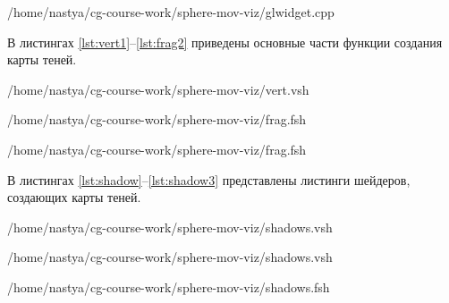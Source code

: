 \begin{lstinputlisting}[
	caption={Продолжение листинга \ref{lst:shadgen}},
	label={lst:shadgen2},
	style={cpp},
	linerange={143-145},
	]{/home/nastya/cg-course-work/sphere-mov-viz/glwidget.cpp}
\end{lstinputlisting}

В листингах \ref{lst:vert1}--\ref{lst:frag2} приведены основные части функции создания карты теней.

\begin{lstinputlisting}[
	caption={Вершинный шейдер},
	label={lst:vert1},
	style={cpp},
	linerange={1-30},
	]{/home/nastya/cg-course-work/sphere-mov-viz/vert.vsh}
\end{lstinputlisting}

\pagebreak

\begin{lstinputlisting}[
	caption={Фрагментный шейдер},
	label={lst:frag1},
	style={cpp},
	linerange={1-47},
	]{/home/nastya/cg-course-work/sphere-mov-viz/frag.fsh}
\end{lstinputlisting}

\begin{lstinputlisting}[
	caption={Продолжение листинга \ref{lst:frag2}},
	label={lst:frag2},
	style={cpp},
	linerange={48-78},
	]{/home/nastya/cg-course-work/sphere-mov-viz/frag.fsh}
\end{lstinputlisting}

В листингах \ref{lst:shadow}--\ref{lst:shadow3} представлены листинги шейдеров, создающих карты теней.

\begin{lstinputlisting}[
	caption={Вершинный шейдер для создания карты теней},
	label={lst:shadow},
	style={cpp},
	linerange={1-7},
	]{/home/nastya/cg-course-work/sphere-mov-viz/shadows.vsh}
\end{lstinputlisting}

\begin{lstinputlisting}[
	caption={Продолжение листинга \ref{lst:shadow}},
	label={lst:shadow2},
	style={cpp},
	linerange={8-11},
	]{/home/nastya/cg-course-work/sphere-mov-viz/shadows.vsh}
\end{lstinputlisting}

\begin{lstinputlisting}[
	caption={Фрагментный шейдер для создания карты теней},
	label={lst:shadow3},
	style={cpp},
	]{/home/nastya/cg-course-work/sphere-mov-viz/shadows.fsh}
\end{lstinputlisting}

